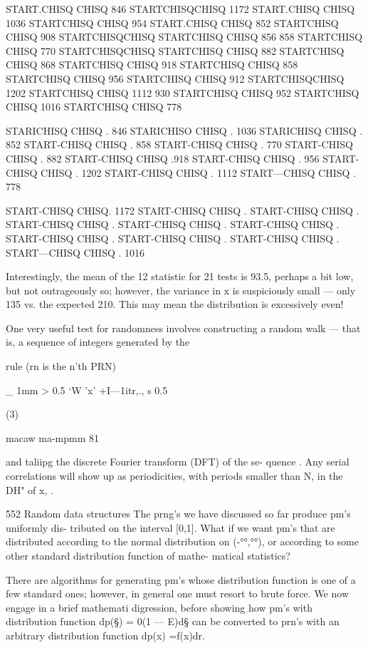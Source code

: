 START.CHISQ CHISQ 846
STARTCHISQCHISQ
1172
START.CHISQ CHISQ 1036 STARTCHISQ CHISQ 954
START.CHISQ CHISQ 852 STARTCHISQ CHISQ 908
STARTCHISQCHISQ STARTCHISQ CHISQ 856
858
STARTCHISQ CHISQ 770 STARTCHISQCHISQ
STARTCHISQ CHISQ 882 STARTCHISQ CHISQ 868
STARTCHISQ CHISQ 918 STARTCHISQ CHISQ 858
STARTCHISQ CHISQ 956 STARTCHISQ CHISQ 912
STARTCHISQCHISQ
1202
STARTCHISQ CHISQ 1112
930
STARTCHISQ CHISQ 952
STARTCHISQ CHISQ 1016
STARTCHISQ CHISQ 778
 

STARICHISQ CHISQ . 846
STARICHISO CHISQ . 1036
STARICHISQ CHISQ . 852
START-CHISQ CHISQ . 858
START-CHISQ CHISQ . 770
START-CHISQ CHISQ . 882
START-CHISQ CHISQ .918
START-CHISQ CHISQ . 956
START-CHISQ CHISQ . 1202
START-CHISQ CHISQ . 1112
START—CHISQ CHISQ . 778

 

START-CHISQ CHISQ. 1172
START-CHISQ CHISQ .
START-CHISQ CHISQ .
START-CHISQ CHISQ .
START-CHISQ CHISQ .
START-CHISQ CHISQ .
START-CHISQ CHISQ .
START-CHISQ CHISQ .
START-CHISQ CHISQ .
START—CHISQ CHISQ . 1016

 

 

Interestingly, the mean of the 12 statistic for 21 tests is 93.5,
perhaps a bit low, but not outrageously so; however, the variance
in x is suspiciously small — only 135 vs. the expected 210. This
may mean the distribution is excessively even!

One very useful test for randomness involves constructing a
random walk — that is, a sequence of integers generated by the

rule (rn is the n'th PRN)

_ 1mm > 0.5
‘W 'x' +I—1itr,., s 0.5

(3)

 

macaw ma-mpmm 81

and taliipg the discrete Fourier transform (DFT) of the se-
quence . Any serial correlations will show up as periodicities,
with periods smaller than N, in the DH" of x, .

552 Random data structures
The prng’s we have discussed so far produce pm’s uniformly dis-
tributed on the interval [0,1]. What if we want pm’s that are
distributed according to the normal distribution on (-°°,°°), or
according to some other standard distribution function of mathe-
matical statistics?

There are algorithms for generating pm’s whose distribution
function is one of a few standard ones; however, in general one
must resort to brute force. We now engage in a brief mathemati
digression, before showing how pm’s with distribution function
dp(§) = 0(1 — E)d§ can be converted to prn’s with an arbitrary
distribution function dp(x) =f(x)dr.

